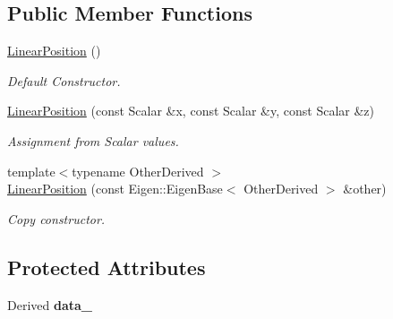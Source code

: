 \subsection*{Public Member Functions}
\begin{DoxyCompactItemize}
\item 
\hyperlink{classow__core_1_1LinearPosition_a2ef1d8e782a06e13acd52130f3e2f503}{Linear\+Position} ()\hypertarget{classow__core_1_1LinearPosition_a2ef1d8e782a06e13acd52130f3e2f503}{}\label{classow__core_1_1LinearPosition_a2ef1d8e782a06e13acd52130f3e2f503}

\begin{DoxyCompactList}\small\item\em Default Constructor. \end{DoxyCompactList}\item 
\hyperlink{classow__core_1_1LinearPosition_af540e92398f5d2e28456118570cc3a8e}{Linear\+Position} (const Scalar \&x, const Scalar \&y, const Scalar \&z)\hypertarget{classow__core_1_1LinearPosition_af540e92398f5d2e28456118570cc3a8e}{}\label{classow__core_1_1LinearPosition_af540e92398f5d2e28456118570cc3a8e}

\begin{DoxyCompactList}\small\item\em Assignment from Scalar values. \end{DoxyCompactList}\item 
{\footnotesize template$<$typename Other\+Derived $>$ }\\\hyperlink{classow__core_1_1LinearPosition_aaee24489f4658cb2302f28db12c5f678}{Linear\+Position} (const Eigen\+::\+Eigen\+Base$<$ Other\+Derived $>$ \&other)
\begin{DoxyCompactList}\small\item\em Copy constructor. \end{DoxyCompactList}\end{DoxyCompactItemize}
\subsection*{Protected Attributes}
\begin{DoxyCompactItemize}
\item 
Derived {\bfseries data\+\_\+}\hypertarget{classow__core_1_1LinearPosition_a99b2abe7e251b1f1be6a6a5343541ecf}{}\label{classow__core_1_1LinearPosition_a99b2abe7e251b1f1be6a6a5343541ecf}

\end{DoxyCompactItemize}


